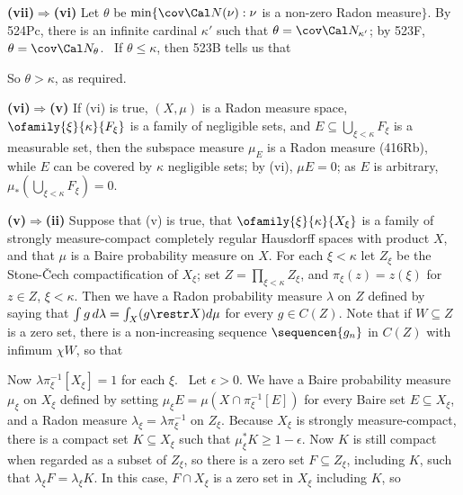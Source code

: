 {\medskip

{\bf (vii)$\Rightarrow$(vi)} Let $\theta$ be
$\min\{\cov\Cal N(\nu):\nu$ is a non-zero Radon measure$\}$.   By 524Pc,
there is an infinite cardinal $\kappa'$ such that
$\theta=\cov\Cal N_{\kappa'}$;  by 523F, $\theta=\cov\Cal N_{\theta}$.
\Quer\ If $\theta\le\kappa$, then 523B tells us that


\noindent So $\theta>\kappa$, as required.

\medskip

{\bf (vi)$\Rightarrow$(v)} If (vi) is true, $(X,\mu)$
is a Radon measure space, $\ofamily{\xi}{\kappa}{F_{\xi}}$ is a family
of negligible sets, and $E\subseteq\bigcup_{\xi<\kappa}F_{\xi}$
is a measurable set, then the subspace measure $\mu_E$ is a Radon
measure (416Rb), while $E$ can be covered by $\kappa$ negligible sets;
by (vi), $\mu E=0$;  as $E$ is arbitrary,
$\mu_*(\bigcup_{\xi<\kappa}F_{\xi})=0$.

\medskip

{\bf (v)$\Rightarrow$(ii)} Suppose that (v) is true, that
$\ofamily{\xi}{\kappa}{X_{\xi}}$ is a family of strongly
measure-compact completely regular Hausdorff spaces with product $X$,
and that $\mu$ is a Baire probability measure on $X$.   For each
$\xi<\kappa$ let $Z_{\xi}$ be the Stone-\v{C}ech compactification of
$X_{\xi}$;  set $Z=\prod_{\xi<\kappa}Z_{\xi}$, and $\pi_{\xi}(z)=z(\xi)$
for $z\in Z$, $\xi<\kappa$.   Then we have a Radon probability measure
$\lambda$ on $Z$ defined by saying that
$\int g\,d\lambda=\int_X(g\restr X)d\mu$ for every $g\in C(Z)$.   Note
that if $W\subseteq Z$ is a zero set, there is a non-increasing sequence
$\sequencen{g_n}$ in $C(Z)$ with infimum $\chi W$, so that


Now $\lambda\pi_{\xi}^{-1}[X_{\xi}]=1$ for each $\xi$.   \Prf\ Let
$\epsilon>0$.   We have a Baire probability measure $\mu_{\xi}$ on
$X_{\xi}$ defined by setting $\mu_{\xi}E=\mu(X\cap\pi_{\xi}^{-1}[E])$
for every Baire set $E\subseteq X_{\xi}$, and a Radon measure
$\lambda_{\xi}=\lambda\pi_{\xi}^{-1}$ on $Z_{\xi}$.   Because $X_{\xi}$
is strongly measure-compact, there is a compact set $K\subseteq X_{\xi}$
such that
$\mu_{\xi}^*K\ge 1-\epsilon$.   Now $K$ is still compact when regarded
as a subset of $Z_{\xi}$, so there is a zero set $F\subseteq Z_{\xi}$,
including $K$, such that $\lambda_{\xi}F=\lambda_{\xi}K$.   In this
case, $F\cap X_{\xi}$ is a zero set in $X_{\xi}$ including $K$, so

}
